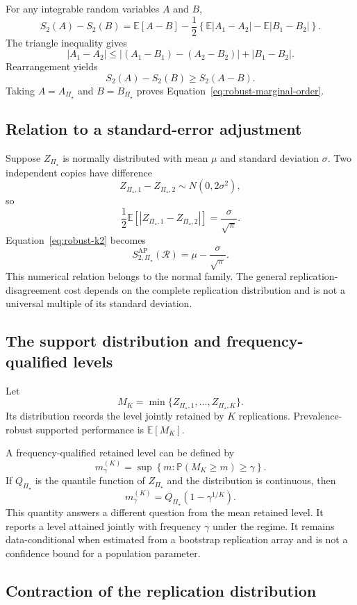 \documentclass[11pt]{article}
\newcommand{\Regime}{\mathcal{R}}
\newcommand{\PSet}{\Pi_\star}
\newcommand{\E}{\mathbb{E}}
\newcommand{\Prb}{\mathbb{P}}
\theoremstyle{remark}
\begin{document}
For any integrable random variables $A$ and $B$,
\[
S_2(A)-S_2(B)
=
\E[A-B]
-
\frac12
\left\{
\E|A_1-A_2|
-
\E|B_1-B_2|
\right\}.
\]
The triangle inequality gives
\[
|A_1-A_2|
\leq
|(A_1-B_1)-(A_2-B_2)|
+
|B_1-B_2|.
\]
Rearrangement yields
\[
S_2(A)-S_2(B)
\geq
S_2(A-B).
\]
Taking $A=A_{\PSet}$ and $B=B_{\PSet}$ proves Equation~\eqref{eq:robust-marginal-order}.

\subsection{Relation to a standard-error adjustment}

Suppose $Z_{\PSet}$ is normally distributed with mean $\mu$ and standard deviation $\sigma$. Two independent copies have difference
\[
Z_{\PSet,1}-Z_{\PSet,2}
\sim
N(0,2\sigma^2),
\]
so
\[
\frac12
\E
\left[
|Z_{\PSet,1}-Z_{\PSet,2}|
\right]
=
\frac{\sigma}{\sqrt{\pi}}.
\]
Equation~\eqref{eq:robust-k2} becomes
\[
S_{2,\PSet}^{\mathrm{AP}}(\Regime)
=
\mu-\frac{\sigma}{\sqrt{\pi}}.
\]
This numerical relation belongs to the normal family. The general replication-disagreement cost depends on the complete replication distribution and is not a universal multiple of its standard deviation.

\subsection{The support distribution and frequency-qualified levels}

Let
\[
M_K
=
\min\{Z_{\PSet,1},\ldots,Z_{\PSet,K}\}.
\]
Its distribution records the level jointly retained by $K$ replications. Prevalence-robust supported performance is $\E[M_K]$.

A frequency-qualified retained level can be defined by
\[
m_\gamma^{(K)}
=
\sup
\left\{
m:
\Prb(M_K\geq m)\geq\gamma
\right\}.
\]
If $Q_{\PSet}$ is the quantile function of $Z_{\PSet}$ and the distribution is continuous, then
\begin{equation}
m_\gamma^{(K)}
=
Q_{\PSet}\left(1-\gamma^{1/K}\right).
\label{eq:frequency-level}
\end{equation}
This quantity answers a different question from the mean retained level. It reports a level attained jointly with frequency $\gamma$ under the regime. It remains data-conditional when estimated from a bootstrap replication array and is not a confidence bound for a population parameter.

\subsection{Contraction of the replication distribution}
\end{document}
